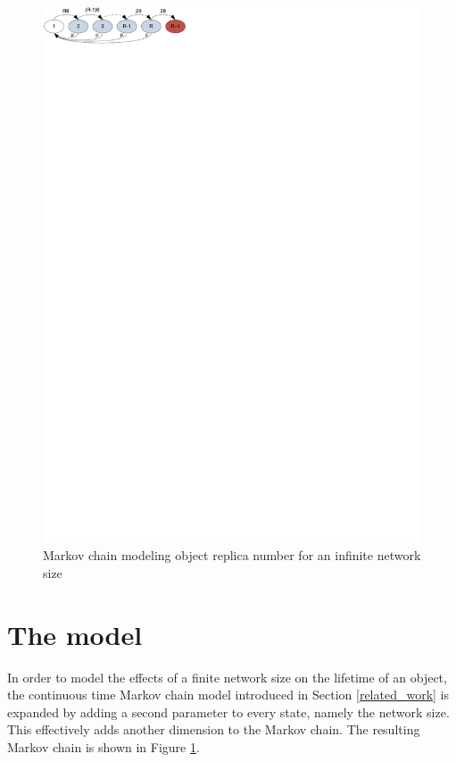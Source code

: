 \documentclass[10pt,a4paper,conference]{IEEEtran}
\begin{document}
\begin{figure}[htbp]
 \centering
 \includegraphics[clip=true, viewport=0.0cm 27.5cm 8.0cm 30.0cm, width=0.7\columnwidth]{inifinite_network_chain}
 \caption{Markov chain modeling object replica number for an infinite network size}
 \label{fig_markov_chain}
\end{figure}

\section{The model}
\label{model}

In order to model the effects of a finite network size on the lifetime of an object, the continuous time Markov chain model introduced in Section \ref{related_work} is expanded by adding a second parameter to every state, namely the network size. This effectively adds another dimension to the Markov chain. The resulting Markov chain is shown in Figure \ref{fig_markov_chain}.
\end{document}
